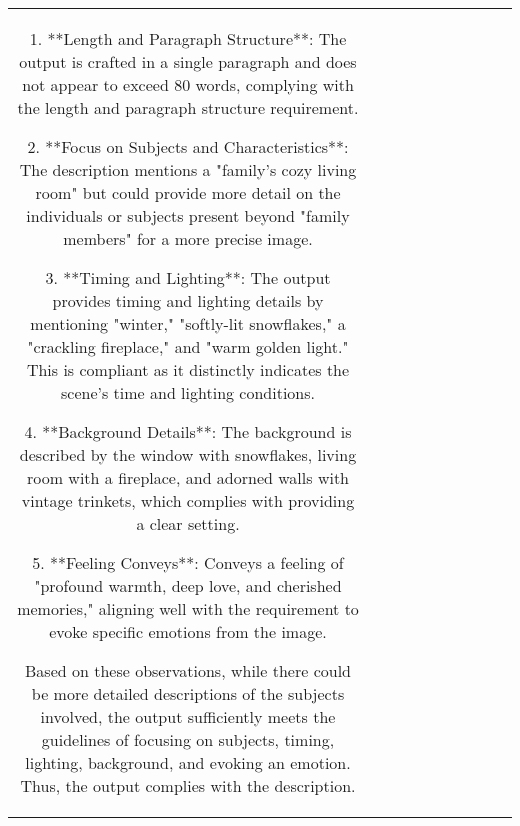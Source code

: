 \begin{table}[h!]
\begin{tabular}{|c|c|c|c|c|c|c|c|c|c|}
1. **Length and Paragraph Structure**: The output is crafted in a single paragraph and does not appear to exceed 80 words, complying with the length and paragraph structure requirement.

2. **Focus on Subjects and Characteristics**: The description mentions a "family's cozy living room" but could provide more detail on the individuals or subjects present beyond "family members" for a more precise image.

3. **Timing and Lighting**: The output provides timing and lighting details by mentioning "winter," "softly-lit snowflakes," a "crackling fireplace," and "warm golden light." This is compliant as it distinctly indicates the scene's time and lighting conditions.

4. **Background Details**: The background is described by the window with snowflakes, living room with a fireplace, and adorned walls with vintage trinkets, which complies with providing a clear setting.

5. **Feeling Conveys**: Conveys a feeling of "profound warmth, deep love, and cherished memories," aligning well with the requirement to evoke specific emotions from the image.

Based on these observations, while there could be more detailed descriptions of the subjects involved, the output sufficiently meets the guidelines of focusing on subjects, timing, lighting, background, and evoking an emotion. Thus, the output complies with the description.


\end{tabular}
\end{table}
